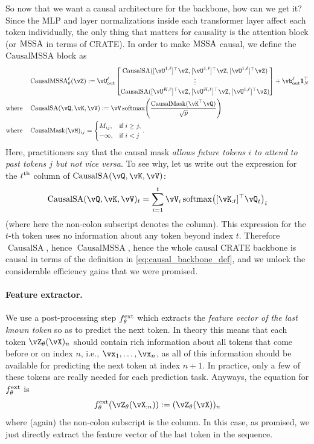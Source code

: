 \documentclass[../../book-main.tex]{subfiles}
\begin{document}
So now that we want a causal architecture for the backbone, how can we get it? Since the MLP and layer normalizations inside each transformer layer affect each token individually, the only thing that matters for causality is the attention block (or \(\operatorname{MSSA}\) in terms of CRATE). In order to make \(\operatorname{MSSA}\) causal, we define the \(\mathrm{CausalMSSA}\) block as 
\begin{align}
    &\operatorname{CausalMSSA}_{\theta}^{\ell}(\vZ) := \vU_{\out}^{\ell}\mat{\operatorname{CausalSA}([\vU^{1, \ell}]^{\top}\vZ, [\vU^{1, \ell}]^{\top}\vZ, [\vU^{1, \ell}]^{\top}\vZ) \\ \vdots \\ \operatorname{CausalSA}([\vU^{K, \ell}]^{\top}\vZ, [\vU^{K, \ell}]^{\top}\vZ, [\vU^{1, \ell}]^{\top}\vZ)} + \vb_{\out}^{\ell}\vone_{N}^{\top} \\ 
    \text{where} \quad & \operatorname{CausalSA}(\vQ, \vK, \vV) := \vV\softmax\rp{\frac{\operatorname{CausalMask}(\vK^{\top}\vQ)}{\sqrt{p}}} \\ 
    \text{where} \quad & \operatorname{CausalMask}(\vM)_{ij} = \casework{M_{ij}, & \text{if}\ i \geq j, \\ -\infty, & \text{if}\ i < j}.
\end{align}
Here, practitioners say that the causal mask \textit{allows future tokens \(i\) to attend to past tokens \(j\) but not vice versa}. To see why, let us write out the expression for the \(t^{\textnormal{th}}\) column of \(\operatorname{CausalSA}(\vQ, \vK, \vV)\):
\begin{equation}
    \operatorname{CausalSA}(\vQ, \vK, \vV)_{t} = \sum_{i = 1}^{t}\vV_{i}\softmax\rp{[\vK_{:t}]^{\top}\vQ_{t}}_{i}
\end{equation}
(where here the non-colon subscript denotes the column). This expression for the \(t\)-th token uses no information about any token beyond index \(t\). Therefore \(\operatorname{CausalSA}\), hence \(\operatorname{CausalMSSA}\), hence the whole causal CRATE backbone is causal in terms of the definition in \eqref{eq:causal_backbone_def}, and we unlock the considerable efficiency gains that we were promised. 

\paragraph{Feature extractor.} We use a post-processing step \(f_{\theta}^{\mathrm{ext}}\) which extracts the \textit{feature vector of the last known token} so as to predict the next token. In theory this means that each token \(\vZ_{\theta}(\vX)_{n}\) should contain rich information about all tokens that come before or on index \(n\), i.e., \(\vx_{1}, \dots, \vx_{n}\), as all of this information should be available for predicting the next token at index \(n + 1\). In practice, only a few of these tokens are really needed for each prediction task. Anyways, the equation for \(f_{\theta}^{\mathrm{ext}}\) is 
\begin{equation}
    f_{\theta}^{\ext}(\vZ_{\theta}(\vX_{:n})) := (\vZ_{\theta}(\vX))_{n}
\end{equation}
where (again) the non-colon subscript is the column. In this case, as promised, we just directly extract the feature vector of the last token in the sequence.
\end{document}
